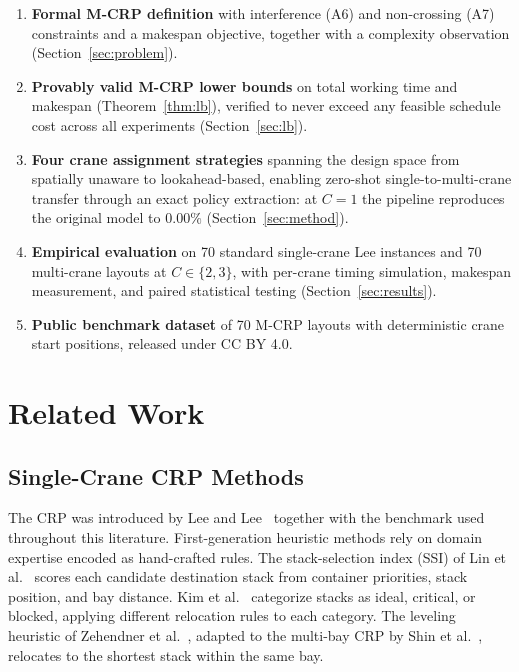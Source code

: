 \documentclass[11pt,a4paper]{elsarticle}
\begin{document}
\begin{enumerate}
    \item[{[C1]}] \textbf{Formal M-CRP definition} with interference (A6) and non-crossing (A7) constraints and a makespan objective, together with a complexity observation (Section~\ref{sec:problem}).
    \item[{[C2]}] \textbf{Provably valid M-CRP lower bounds} on total working time and makespan (Theorem~\ref{thm:lb}), verified to never exceed any feasible schedule cost across all experiments (Section~\ref{sec:lb}).
    \item[{[C3]}] \textbf{Four crane assignment strategies} spanning the design space from spatially unaware to lookahead-based, enabling zero-shot single-to-multi-crane transfer through an exact policy extraction: at $C=1$ the pipeline reproduces the original model to $0.00\%$ (Section~\ref{sec:method}).
    \item[{[C4]}] \textbf{Empirical evaluation} on 70 standard single-crane Lee instances and 70 multi-crane layouts at $C\in\{2,3\}$, with per-crane timing simulation, makespan measurement, and paired statistical testing (Section~\ref{sec:results}).
    \item[{[C5]}] \textbf{Public benchmark dataset} of 70 M-CRP layouts with deterministic crane start positions, released under CC BY 4.0.
\end{enumerate}

\section{Related Work}
\label{sec:related}

\subsection{Single-Crane CRP Methods}

The CRP was introduced by Lee and Lee~\cite{lee2010} together with the benchmark used throughout this literature. First-generation heuristic methods rely on domain expertise encoded as hand-crafted rules. The stack-selection index (SSI) of Lin et al.~\cite{lin2015} scores each candidate destination stack from container priorities, stack position, and bay distance. Kim et al.~\cite{kim2016} categorize stacks as ideal, critical, or blocked, applying different relocation rules to each category. The leveling heuristic of Zehendner et al.~\cite{zehendner2017}, adapted to the multi-bay CRP by Shin et al.~\cite{shin2026}, relocates to the shortest stack within the same bay.
\end{document}
